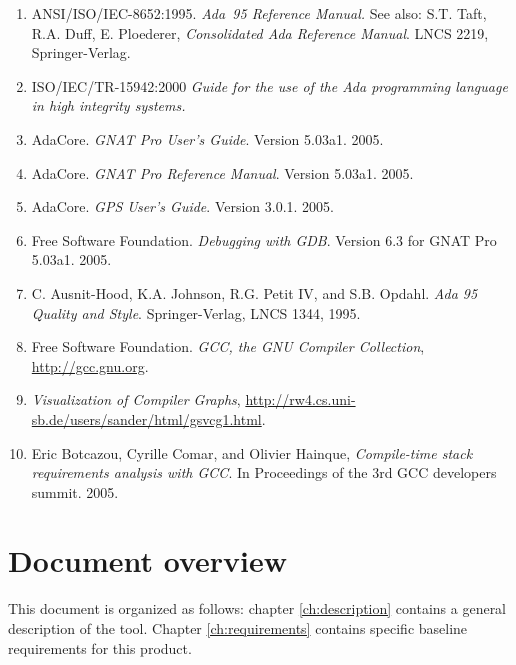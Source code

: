 \begin{enumerate}[{R}1.]
\item \label{ALRM}
   ANSI/ISO/IEC-8652:1995. \textit{Ada~95 Reference Manual.}
   See also: S.T. Taft, R.A. Duff, E. Ploederer, \textit{Consolidated
     Ada Reference Manual}. LNCS 2219, Springer-Verlag.
\item  \label{HIS}
   ISO/IEC/TR-15942:2000 \textit{Guide for the use of the Ada programming
   language in high integrity systems.} 
\item \label{GNATUG}
      AdaCore. \textit{GNAT Pro User's Guide}. Version 5.03a1. 2005.
\item \label{GNATRM}
      AdaCore. \textit{GNAT Pro Reference Manual}. Version 5.03a1. 2005.
\item \label{GPS}
      AdaCore. \textit{GPS User's Guide}. Version 3.0.1. 2005.
\item \label{GDB}
      Free Software Foundation. \textit{Debugging with GDB}. Version 6.3 for GNAT Pro 5.03a1. 2005.
\item \label{AdaQS}
  C. Ausnit-Hood, K.A. Johnson, R.G. Petit IV, and S.B. Opdahl.
  \textit{Ada 95 Quality and Style}.
  Springer-Verlag, LNCS 1344, 1995.
\item \label{GCC}
      Free Software Foundation. \textit{GCC, the GNU Compiler Collection}, \url{http://gcc.gnu.org}.
\item \label{VCG}
      \textit{Visualization of Compiler Graphs}, \url{http://rw4.cs.uni-sb.de/users/sander/html/gsvcg1.html}.
\item \label{GCCSTACK}
      Eric Botcazou, Cyrille Comar, and Olivier Hainque, \textit{Compile-time stack requirements analysis with GCC}. In Proceedings of the 3rd GCC developers summit. 2005.
\end{enumerate}

\section{Document overview}

This document is organized as follows:
chapter \ref{ch:description} contains a general description of the
tool. Chapter \ref{ch:requirements} contains specific baseline
requirements for this product.


